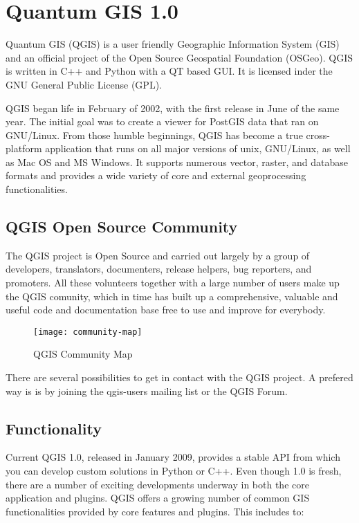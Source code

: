 \section{Quantum GIS 1.0}
\setcounter{page}{1}

Quantum GIS (QGIS) is a user friendly Geographic Information System (GIS) and
an official project of the Open Source Geospatial Foundation (OSGeo). QGIS is
written in C++ and Python with a QT based GUI. It is licensed inder the GNU
General Public License (GPL).


QGIS began life in February of 2002, with the first release in June of the
same year. The initial goal was to create a viewer for PostGIS data that ran
on GNU/Linux. From those humble beginnings, QGIS has become a true
cross-platform application that runs on all major versions of unix,
GNU/Linux, as well as Mac OS and MS Windows. It supports numerous vector,
raster, and database formats and provides a wide variety of core and external
geoprocessing functionalities.

\subsection{QGIS Open Source Community}

The QGIS project is Open Source and carried out largely by a group of
developers, translators, documenters, release helpers, bug reporters, and
promoters. All these volunteers together with a large number of users make up
the QGIS comunity, which in time has built up a comprehensive, valuable and
useful code and documentation base free to use and improve for everybody.

\begin{figure}[h]
   \begin{center}
   \caption{QGIS Community Map}\label{fig:community-map}\smallskip
   \texttt{[image: community-map]}
\end{center}
\end{figure}

There are several possibilities to get in contact with the QGIS project. 
A prefered way is is by joining the qgis-users mailing list or the QGIS Forum. 

\subsection{Functionality}

Current QGIS 1.0, released in January 2009, provides a stable API from which
you can develop custom solutions in Python or C++. Even though 1.0 is fresh,
there are a number of exciting developments underway in both the core
application and plugins. QGIS offers a growing number of common GIS
functionalities provided by core features and plugins. This includes to:

